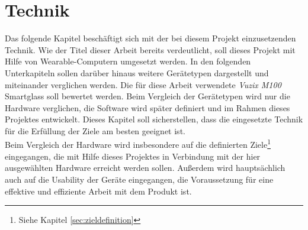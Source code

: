 \chapter{Technik}
\label{cha:technik}
Das folgende Kapitel beschäftigt sich mit der bei diesem Projekt einzusetzenden Technik. Wie der Titel dieser Arbeit bereits verdeutlicht, soll dieses Projekt mit Hilfe von Wearable-Computern umgesetzt werden. In den folgenden Unterkapiteln sollen darüber hinaus weitere Gerätetypen dargestellt und miteinander verglichen werden. Die für diese Arbeit verwendete \emph{Vuzix M100} Smartglass soll bewertet werden. Beim Vergleich der Gerätetypen wird nur die Hardware verglichen, die Software wird später definiert und im Rahmen dieses Projektes entwickelt. Dieses Kapitel soll sicherstellen, dass die eingesetzte Technik für die Erfüllung der Ziele am besten geeignet ist.\\

Beim Vergleich der Hardware wird insbesondere auf die definierten Ziele\footnote{Siehe Kapitel \ref{sec:zieldefinition} } eingegangen, die mit Hilfe dieses Projektes in Verbindung mit der hier ausgewählten Hardware erreicht werden sollen. Außerdem wird hauptsächlich auch auf die Usability der Geräte eingegangen, die Voraussetzung für eine effektive und effiziente Arbeit mit dem Produkt ist. 

